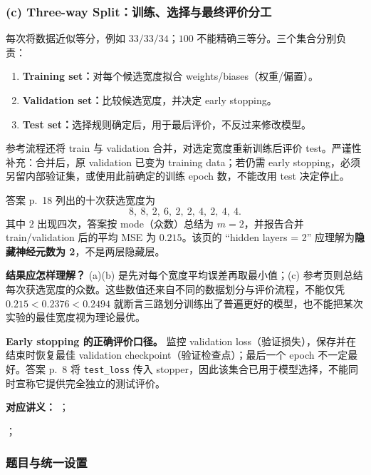 \begin{workedsolution}
\subsubsection*{(c) Three-way Split：训练、选择与最终评价分工}

每次将数据近似等分，例如 $33/33/34$；$100$ 不能精确三等分。三个集合分别负责：
\begin{enumerate}
  \item \textbf{Training set：}对每个候选宽度拟合 weights/biases（权重/偏置）。
  \item \textbf{Validation set：}比较候选宽度，并决定 early stopping。
  \item \textbf{Test set：}选择规则确定后，用于最后评价，不反过来修改模型。
\end{enumerate}
参考流程还将 train 与 validation 合并，对选定宽度重新训练后评价 test。严谨性补充：合并后，原 validation 已变为 training data；若仍需 early stopping，必须另留内部验证集，或使用此前确定的训练 epoch 数，不能改用 test 决定停止。

答案 p.~18 列出的十次获选宽度为
\[
  8,\ 8,\ 2,\ 6,\ 2,\ 2,\ 4,\ 2,\ 4,\ 4.
\]
其中 $2$ 出现四次，答案按 mode（众数）总结为 $\boxed{m=2}$，并报告合并 train/validation 后的平均 MSE 为 $0.215$。该页的 ``hidden layers = 2'' 应理解为\textbf{隐藏神经元数为 2}，不是两层隐藏层。

\textbf{结果应怎样理解？}
(a)(b) 是先对每个宽度平均误差再取最小值；(c) 参考页则总结每次获选宽度的众数。这些数值还来自不同的数据划分与评价流程，不能仅凭 $0.215<0.2376<0.2494$ 就断言三路划分训练出了普遍更好的模型，也不能把某次实验的最佳宽度视为理论最优。

\textbf{Early stopping 的正确评价口径。}
监控 validation loss（验证损失），保存并在结束时恢复最佳 validation checkpoint（验证检查点）；最后一个 epoch 不一定最好。答案 p.~8 将 \texttt{test\_loss} 传入 stopper，因此该集合已用于模型选择，不能同时宣称它提供完全独立的测试评价。
\end{workedsolution}

\nopagebreak[4]

\textbf{对应讲义：}
；\par\noindent
{}；\par\noindent
{}

\subsubsection*{题目与统一设置}

